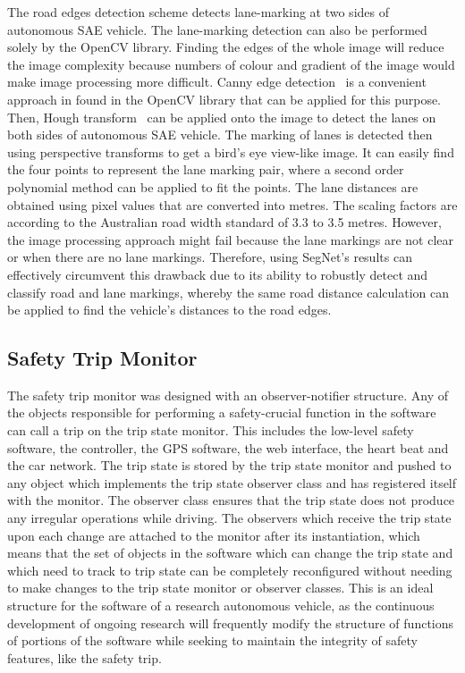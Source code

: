 The road edges detection scheme detects lane-marking at two sides of autonomous SAE vehicle. The lane-marking detection can also be performed solely by the OpenCV library. Finding the edges of the whole image will reduce the image complexity because numbers of colour and gradient of the image would make image processing more difficult. Canny edge detection~\cite{canny_computational_1986} is a convenient approach in found in the OpenCV library that can be applied for this purpose. Then, Hough transform~\cite{hough_method_1962} can be applied onto the image to detect the lanes on both sides of autonomous SAE vehicle. The marking of lanes is detected then using perspective transforms to get a bird’s eye view-like image. It can easily find the four points to represent the lane marking pair, where a second order polynomial method can be applied to fit the points. The lane distances are obtained using pixel values that are converted into metres. The scaling factors are according to the Australian road width standard of 3.3 to 3.5 metres. However, the image processing approach might fail because the lane markings are not clear or when there are no lane markings. Therefore, using SegNet's results can effectively circumvent this drawback due to its ability to robustly detect and classify road and lane markings, whereby the same road distance calculation can be applied to find the vehicle's distances to the road edges.

\subsection{Safety Trip Monitor}
The safety trip monitor was designed with an observer-notifier structure. Any of the objects responsible for performing a safety-crucial function in the software can call a trip on the trip state monitor. This includes the low-level safety software, the controller, the GPS software, the web interface, the heart beat and the car network. The trip state is stored by the trip state monitor and pushed to any object which implements the trip state observer class and has registered itself with the monitor. The observer class ensures that the trip state does not produce any irregular operations while driving. The observers which receive the trip state upon each change are attached to the monitor after its instantiation, which means that the set of objects in the software which can change the trip state and which need to track to trip state can be completely reconfigured without needing to make changes to the trip state monitor or observer classes. This is an ideal structure for the software of a research autonomous vehicle, as the continuous development of ongoing research will frequently modify the structure of functions of portions of the software while seeking to maintain the integrity of safety features, like the safety trip.

